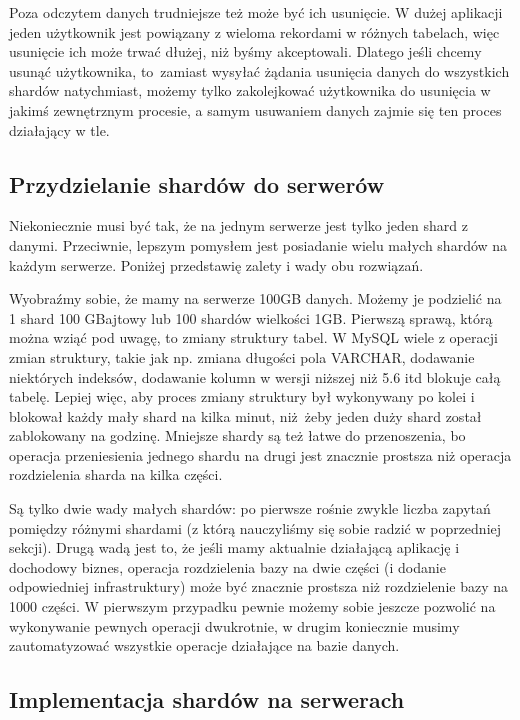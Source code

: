 \documentclass[a4paper,12pt]{article}
\begin{document}
Poza odczytem danych trudniejsze też może być ich usunięcie. W dużej aplikacji jeden użytkownik jest powiązany z wieloma rekordami w różnych tabelach, więc usunięcie ich może trwać dłużej, niż byśmy akceptowali. Dlatego jeśli chcemy usunąć użytkownika, to~zamiast wysyłać żądania usunięcia danych do wszystkich shardów natychmiast, możemy tylko zakolejkować użytkownika do usunięcia w jakimś zewnętrznym procesie, a samym usuwaniem danych zajmie się ten proces działający w tle.

\subsection{Przydzielanie shardów do serwerów}

Niekoniecznie musi być tak, że na jednym serwerze jest tylko jeden shard z danymi. Przeciwnie, lepszym pomysłem jest posiadanie wielu małych shardów na każdym serwerze. Poniżej przedstawię zalety i wady obu rozwiązań.

Wyobraźmy sobie, że mamy na serwerze 100GB danych. Możemy je podzielić na 1 shard 100 GBajtowy lub 100 shardów wielkości 1GB. Pierwszą sprawą, którą można wziąć pod uwagę, to zmiany struktury tabel. W MySQL wiele z operacji zmian struktury, takie jak np. zmiana długości pola VARCHAR, dodawanie niektórych indeksów, dodawanie kolumn w wersji niższej niż 5.6 itd blokuje całą tabelę. Lepiej więc, aby proces zmiany struktury był wykonywany po kolei i blokował każdy mały shard na kilka minut, niż żeby jeden duży shard został zablokowany na godzinę. Mniejsze shardy są też łatwe do przenoszenia, bo operacja przeniesienia jednego shardu na drugi jest znacznie prostsza niż operacja rozdzielenia sharda na kilka części.

Są tylko dwie wady małych shardów: po pierwsze rośnie zwykle liczba zapytań pomiędzy różnymi shardami (z którą nauczyliśmy się sobie radzić w poprzedniej sekcji). Drugą wadą jest to, że jeśli mamy aktualnie działającą aplikację i dochodowy biznes, operacja rozdzielenia bazy na dwie części (i dodanie odpowiedniej infrastruktury) może być znacznie prostsza niż rozdzielenie bazy na 1000 części. W pierwszym przypadku pewnie możemy sobie jeszcze pozwolić na wykonywanie pewnych operacji dwukrotnie, w drugim koniecznie musimy zautomatyzować wszystkie operacje działające na bazie danych.

\subsection{Implementacja shardów na serwerach}
\end{document}
